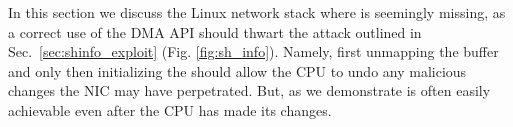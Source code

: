 In this section we discuss the Linux network stack where \oportunity is seemingly missing, as 
a correct use of the DMA API should thwart the attack outlined in Sec.~\ref{sec:shinfo_exploit} (Fig. \ref{fig:sh_info}). Namely, first unmapping the buffer and only then initializing the \shinfo{} should allow the CPU to undo any malicious changes the NIC may have perpetrated. But, as we demonstrate \oportunity is often easily achievable even after the CPU has made its changes.


